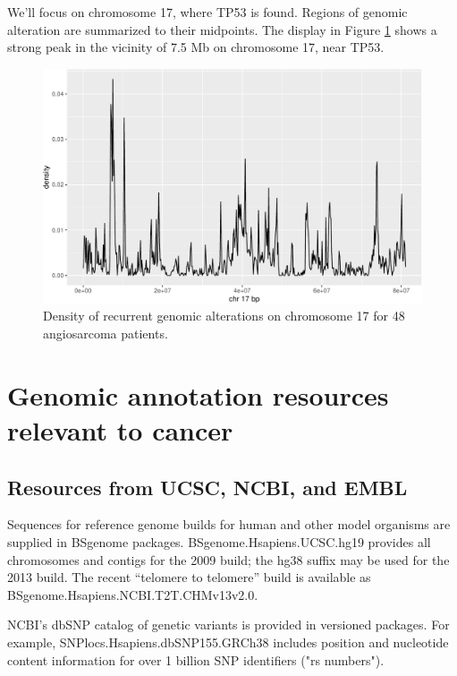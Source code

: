 We'll focus on chromosome 17, where TP53 is found. Regions
of genomic alteration are summarized to their midpoints.
The display in Figure \ref{fig:mkden} shows a strong peak in the vicinity of 7.5 Mb on chromosome 17, near TP53.


\begin{figure}
\includegraphics[width=1\linewidth,]{bioccb_files/figure-latex/mkden-1} \caption{Density of recurrent genomic alterations on chromosome 17 for 48 angiosarcoma patients.}\label{fig:mkden}
\end{figure}



\section{Genomic annotation resources relevant to cancer}\label{hubs}


\subsection{Resources from UCSC, NCBI, and EMBL}\label{resources-from-ucsc-ncbi-and-embl}

Sequences for reference genome builds for human and
other model organisms are supplied in BSgenome packages.
BSgenome.Hsapiens.UCSC.hg19 provides all chromosomes and
contigs for the 2009 build; the hg38 suffix may be used
for the 2013 build. The recent ``telomere to telomere''
build is available as BSgenome.Hsapiens.NCBI.T2T.CHMv13v2.0.

NCBI's dbSNP catalog of genetic variants is provided
in versioned packages.
For example, SNPlocs.Hsapiens.dbSNP155.GRCh38 includes
position and nucleotide content information for over
1 billion SNP identifiers ("rs numbers").

